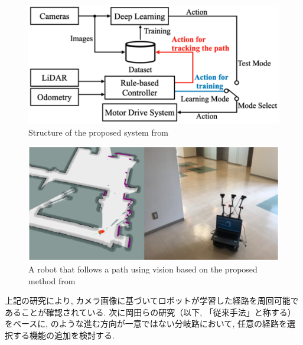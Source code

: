 \vspace{2.5cm}

\begin{figure}[hbtp]
     \centering
     \includegraphics[keepaspectratio, scale=0.55]
          {images/okada_structure.png}
     \caption{Structure of the proposed system from \cite{okada1}}
     \label{Fig:okada_structure}
\end{figure}

\begin{figure}[hbtp]
     \centering
    \includegraphics[keepaspectratio, scale=0.5]
         {images/okada_nav.png}
    \caption{A robot that follows a path using vision based on the proposed method from \cite{okada1}}
    \label{Fig:okada_nav}
\end{figure}

\newpage

上記の研究により, カメラ画像に基づいてロボットが学習した経路を周回可能であることが確認されている. 次に岡田ら\cite{okada1}の研究（以下, 「従来手法」と称する）をベースに, のような進む方向が一意ではない分岐路において, 任意の経路を選択する機能の追加を検討する.

\vspace{1cm}

